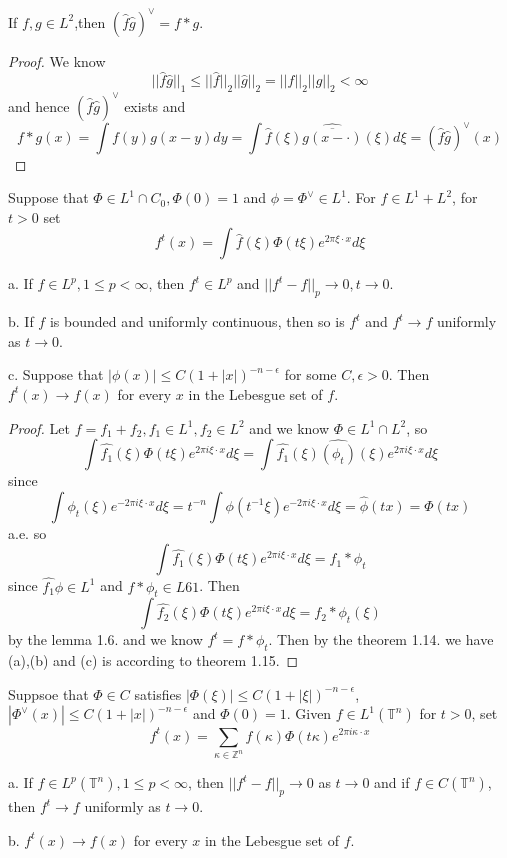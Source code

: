 \documentclass[lang=en, color=blue, ]{elegantbook}
\newcommand{\Z}{\mathbb{Z}}
\newcommand{\T}{\mathbb{T}}
\begin{document}
\begin{lemma}
    If $f,g\in L^2$,then $(\hat{f}\hat{g})^{\vee} = f*g$. 
\end{lemma}
\begin{proof}
    We know
    \[
    ||\hat{f}\hat{g}||_1 \leq ||\hat{f}||_2||\hat{g}||_2 = ||f||_2||g||_2 < \infty
    \]
    and hence $(\hat{f}\hat{g})^{\vee}$ exists and
    \[
    f*g(x) = \int f(y)g(x-y)dy = \int\hat{f}(\xi)\widehat{\overline{g(x-\cdot)}}(\xi) d\xi = (\hat{f}\hat{g})^{\vee}(x)
    \]
\end{proof}

\begin{theorem}
    Suppose that $\Phi \in L^1\cap C_0, \Phi(0) = 1$ and $\phi = \Phi^{\vee}\in L^1$. For $f\in L^1+L^2$, for $t>0$ set
    \[
    f^t(x) = \int \hat{f}(\xi)\Phi(t\xi)e^{2\pi \xi \cdot x}d\xi
    \]\par
    a. If $f\in L^p, 1\leq p < \infty$, then $f^t\in L^p$ and $||f^t - f||_p \to 0, t\to 0$.\par
    b. If $f$ is bounded and uniformly continuous, then so is $f^t$ and $f^t\to f$ uniformly as $t\to 0$.\par
    c. Suppose that $|\phi(x)|\leq C(1+|x|)^{-n-\epsilon}$ for some $C,\epsilon > 0$. Then $f^t(x)\to f(x)$ for every $x$ in the Lebesgue set of $f$.
\end{theorem}
\begin{proof}\par
    Let $f=f_1+f_2, f_1\in L^1,f_2\in L^2$ and we know $\Phi\in L^1\cap L^2$, so
    \[
    \int \hat{f_1}(\xi)\Phi(t\xi)e^{2\pi i \xi\cdot x}d\xi =  \int \hat{f_1}(\xi)\widehat{(\phi_t)}(\xi)e^{2\pi i \xi\cdot x}d\xi
    \]
    since
    \[
    \int \phi_t(\xi)e^{-2\pi i \xi \cdot x}d\xi = t^{-n}\int \phi(t^{-1}\xi)e^{-2\pi i \xi \cdot x}d\xi = \hat{\phi}(tx) = \Phi(tx)
    \]
    a.e. so
    \[
     \int \hat{f_1}(\xi)\Phi(t\xi)e^{2\pi i \xi\cdot x}d\xi = f_1*\phi_t
    \]
    since $\hat{f_1}\phi\in L^1$ and $f*\phi_t \in L61$. Then
    \[
     \int \hat{f_2}(\xi)\Phi(t\xi)e^{2\pi i \xi\cdot x}d\xi = f_2*\phi_t(\xi)
    \]
    by the lemma 1.6. and we know $f^t = f*\phi_t$. Then by the theorem 1.14. we have (a),(b) and (c) is according to theorem 1.15.
\end{proof}

\begin{theorem}
    Suppsoe that $\Phi \in C$ satisfies $|\Phi(\xi)| \leq C(1+|\xi|)^{-n-\epsilon}$, $|\Phi^{\vee}(x)| \leq C(1+|x|)^{-n-\epsilon}$ and $\Phi(0) = 1$. Given $f\in L^1(\T^n)$ for $t>0$, set
    \[
    f^t(x) = \sum\limits_{\kappa\in\Z^n}\hat{f}(\kappa)\Phi(t\kappa)e^{2\pi i \kappa\cdot x}
    \]\par
    a. If $f\in L^p(\T^n), 1\leq p <\infty$, then $||f^t - f||_p \to 0$ as $t\to 0$ and if $f\in C(\T^n)$, then $f^t \to f$ uniformly as $t\to 0$.\par
    b. $f^t(x)\to f(x)$ for every $x$ in the Lebesgue set of $f$.
\end{theorem}
\end{document}
